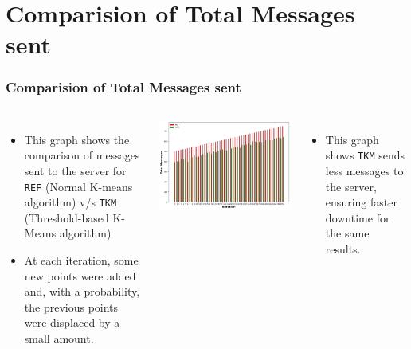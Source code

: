 \documentclass{beamer}
\begin{document}
\section{Comparision of Total Messages sent}
\begin{frame}
  \frametitle{Comparision of Total Messages sent}

  \begin{columns}

    \begin{itemize}
      \item This graph shows the comparison of messages sent to the server for \texttt{REF} (Normal K-means algorithm) v/s \texttt{TKM} (Threshold-based K-Means algorithm)
      \item At each iteration, some new points were added and, with a probability, the previous points were displaced by a small amount.


    \end{itemize}

    \includegraphics[width=1\textwidth]{msg.png}
    \begin{itemize}
      \vspace{-0.2cm}
      \item \small This graph shows \texttt{TKM} sends less messages to the server, ensuring faster downtime for the same results.
    \end{itemize}
  \end{columns}
\end{frame}
\end{document}

